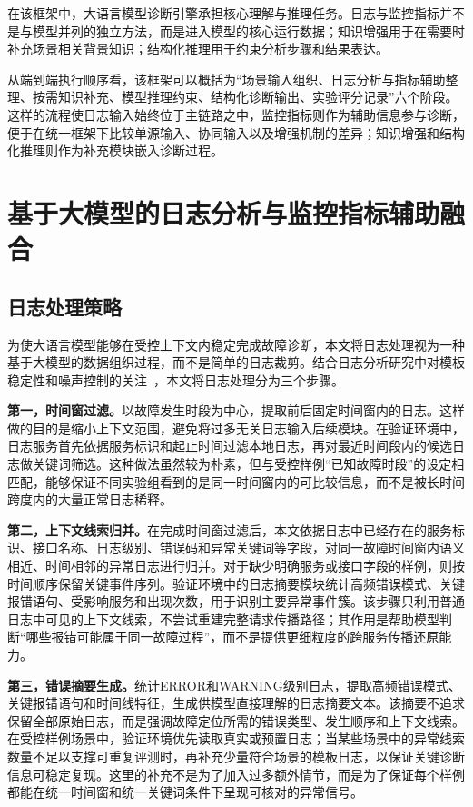 在该框架中，大语言模型诊断引擎承担核心理解与推理任务。日志与监控指标并不是与模型并列的独立方法，而是进入模型的核心运行数据；知识增强用于在需要时补充场景相关背景知识；结构化推理用于约束分析步骤和结果表达。

从端到端执行顺序看，该框架可以概括为“场景输入组织、日志分析与指标辅助整理、按需知识补充、模型推理约束、结构化诊断输出、实验评分记录”六个阶段。这样的流程使日志输入始终位于主链路之中，监控指标则作为辅助信息参与诊断，便于在统一框架下比较单源输入、协同输入以及增强机制的差异；知识增强和结构化推理则作为补充模块嵌入诊断过程。

\section{基于大模型的日志分析与监控指标辅助融合}

\subsection{日志处理策略}

为使大语言模型能够在受控上下文内稳定完成故障诊断，本文将日志处理视为一种基于大模型的数据组织过程，而不是简单的日志裁剪。结合日志分析研究中对模板稳定性和噪声控制的关注~\cite{du2017deeplog,zhang2019logrobust,liu2024logprompt}，本文将日志处理分为三个步骤。

\textbf{第一，时间窗过滤。}以故障发生时段为中心，提取前后固定时间窗内的日志。这样做的目的是缩小上下文范围，避免将过多无关日志输入后续模块。在验证环境中，日志服务首先依据服务标识和起止时间过滤本地日志，再对最近时间段内的候选日志做关键词筛选。这种做法虽然较为朴素，但与受控样例“已知故障时段”的设定相匹配，能够保证不同实验组看到的是同一时间窗内的可比较信息，而不是被长时间跨度内的大量正常日志稀释。

\textbf{第二，上下文线索归并。}在完成时间窗过滤后，本文依据日志中已经存在的服务标识、接口名称、日志级别、错误码和异常关键词等字段，对同一故障时间窗内语义相近、时间相邻的异常日志进行归并。对于缺少明确服务或接口字段的样例，则按时间顺序保留关键事件序列。验证环境中的日志摘要模块统计高频错误模式、关键报错语句、受影响服务和出现次数，用于识别主要异常事件簇。该步骤只利用普通日志中可见的上下文线索，不尝试重建完整请求传播路径；其作用是帮助模型判断“哪些报错可能属于同一故障过程”，而不是提供更细粒度的跨服务传播还原能力。

\textbf{第三，错误摘要生成。}统计ERROR和WARNING级别日志，提取高频错误模式、关键报错语句和时间线特征，生成供模型直接理解的日志摘要文本。该摘要不追求保留全部原始日志，而是强调故障定位所需的错误类型、发生顺序和上下文线索。在受控样例场景中，验证环境优先读取真实或预置日志；当某些场景中的异常线索数量不足以支撑可重复评测时，再补充少量符合场景的模板日志，以保证关键诊断信息可稳定复现。这里的补充不是为了加入过多额外情节，而是为了保证每个样例都能在统一时间窗和统一关键词条件下呈现可核对的异常信号。

